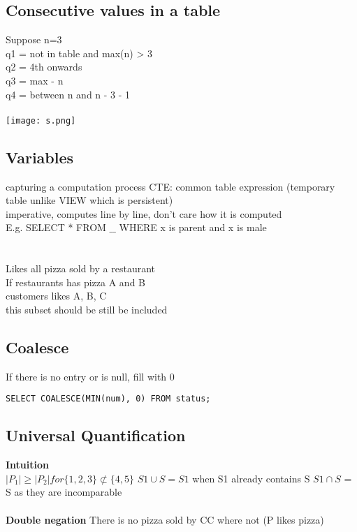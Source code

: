 \documentclass[11pt]{article}
\begin{document}
\subsection*{Consecutive values in a table}
Suppose n=3\\
q1 = not in table and max(n) > 3 \\
q2 = 4th onwards \\
q3 = max - n\\
q4 = between n and n - 3 - 1 \\
\\
\texttt{[image: s.png]}
\subsection*{Variables}
capturing a computation process
CTE: common table expression (temporary table unlike VIEW which is persistent)
\\
imperative, computes line by line, don't care how it is computed\\
E.g. SELECT * FROM $\_\_$ WHERE x is parent and x is male \\
\\
\\
Likes all pizza sold by a restaurant\\
If restaurants has pizza A and B\\
customers likes A, B, C\\
this subset should be still be included
\subsection*{Coalesce}
If there is no entry or is null, fill with 0\\
\begin{verbatim}
SELECT COALESCE(MIN(num), 0) FROM status;	
\end{verbatim}
\subsection*{Universal Quantification}
\textbf{Intuition}
\\
$|P_{1}| \geq |P_{2}| for \{1, 2, 3\} \not\subset \{4, 5\}$
$S1 \cup S = S1$ when S1 already contains S
$S1 \cap S$ = S
as they are incomparable
\\\\
\textbf{Double negation}
There is no pizza sold by CC where not (P likes pizza) 
\end{document}

